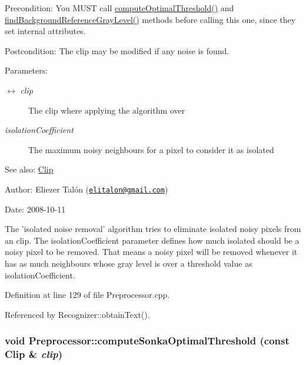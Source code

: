 \begin{Desc}
\item[Precondition:]You MUST call \hyperlink{class_preprocessor_aaeb94a3b52b835bc26efebb40be25bc}{computeOptimalThreshold()} and \hyperlink{class_preprocessor_a941f81382bd8e235e4dd12481342be4}{findBackgroundReferenceGrayLevel()} methods before calling this one, since they set internal attributes.\end{Desc}
\begin{Desc}
\item[Postcondition:]The clip may be modified if any noise is found.\end{Desc}
\begin{Desc}
\item[Parameters:]
\begin{description}
\item[\mbox{$\leftrightarrow$} {\em clip}]The clip where applying the algorithm over \item[{\em isolationCoefficient}]The maximum noisy neighbours for a pixel to consider it as isolated\end{description}
\end{Desc}
\begin{Desc}
\item[See also:]\hyperlink{class_clip}{Clip}\end{Desc}
\begin{Desc}
\item[Author:]Eliezer Talón (\href{mailto:elitalon@gmail.com}{\tt elitalon@gmail.com}) \end{Desc}
\begin{Desc}
\item[Date:]2008-10-11\end{Desc}
The 'isolated noise removal' algorithm tries to eliminate isolated noisy pixels from an clip. The isolationCoefficient parameter defines how much isolated should be a noisy pixel to be removed. That means a noisy pixel will be removed whenever it has as much neighbours whose gray level is over a threshold value as isolationCoefficient. 

Definition at line 129 of file Preprocessor.cpp.

Referenced by Recognizer::obtainText().\hypertarget{class_preprocessor_3d4fa7e4721c62997beb93a41d729c99}{
\subsubsection[computeSonkaOptimalThreshold]{\setlength{\rightskip}{0pt plus 5cm}void Preprocessor::computeSonkaOptimalThreshold (const {\bf Clip} \& {\em clip})}}
\label{class_preprocessor_3d4fa7e4721c62997beb93a41d729c99}


